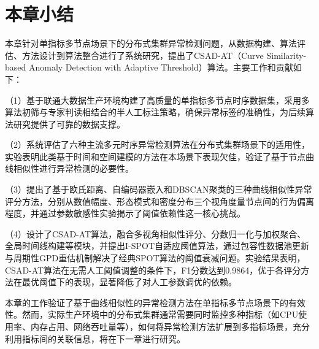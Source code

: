 \section{本章小结}\label{sec:ch3_summary}

本章针对单指标多节点场景下的分布式集群异常检测问题，从数据构建、算法评估、方法设计到算法整合进行了系统研究，提出了CSAD-AT（Curve Similarity-based Anomaly Detection with Adaptive Threshold）算法。主要工作和贡献如下：

（1）基于联通大数据生产环境构建了高质量的单指标多节点时序数据集，采用多算法初筛与专家判读相结合的半人工标注策略，确保异常标签的准确性，为后续算法研究提供了可靠的数据支撑。

（2）系统评估了六种主流多元时序异常检测算法在分布式集群场景下的适用性，实验表明此类基于时间和空间建模的方法在本场景下表现欠佳，验证了基于节点曲线相似性进行异常检测的必要性。

（3）提出了基于欧氏距离、自编码器嵌入和DBSCAN聚类的三种曲线相似性异常评分方法，分别从数值幅度、形态模式和密度分布三个视角度量节点间的行为偏离程度，并通过参数敏感性实验揭示了阈值依赖性这一核心挑战。

（4）设计了CSAD-AT算法，融合多视角相似性评分、分数归一化与加权聚合、全局时间线构建等模块，并提出I-SPOT自适应阈值算法，通过包容性数据池更新与周期性GPD重估机制解决了经典SPOT算法的阈值衰减问题。实验结果表明，CSAD-AT算法在无需人工阈值调整的条件下，F1分数达到0.9864，优于各评分方法在最优阈值下的表现，显著降低了对人工参数调优的依赖。

本章的工作验证了基于曲线相似性的异常检测方法在单指标多节点场景下的有效性。然而，实际生产环境中的分布式集群通常需要同时监控多种指标（如CPU使用率、内存占用、网络吞吐量等），如何将异常检测方法扩展到多指标场景，充分利用指标间的关联信息，将在下一章进行研究。
\endinput
